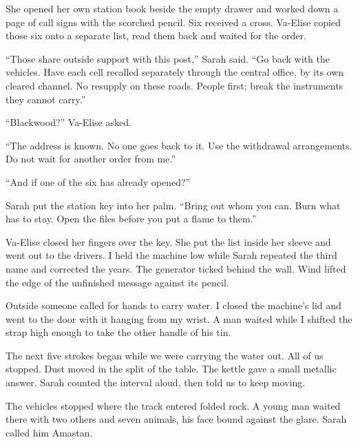 She opened her own station book beside the empty drawer and worked down a page of call signs with the scorched pencil. Six received a cross. Va-Elise copied those six onto a separate list, read them back and waited for the order.\par

``Those share outside support with this post,'' Sarah said. ``Go back with the vehicles. Have each cell recalled separately through the central office, by its own cleared channel. No resupply on these roads. People first; break the instruments they cannot carry.''\par

``Blackwood?'' Va-Elise asked.\par

``The address is known. No one goes back to it. Use the withdrawal arrangements. Do not wait for another order from me.''\par

``And if one of the six has already opened?''\par

Sarah put the station key into her palm. ``Bring out whom you can. Burn what has to stay. Open the files before you put a flame to them.''\par

Va-Elise closed her fingers over the key. She put the list inside her sleeve and went out to the drivers. I held the machine low while Sarah repeated the third name and corrected the years. The generator ticked behind the wall. Wind lifted the edge of the unfinished message against its pencil.\par

Outside someone called for hands to carry water. I closed the machine's lid and went to the door with it hanging from my wrist. A man waited while I shifted the strap high enough to take the other handle of his tin.\par

The next five strokes began while we were carrying the water out. All of us stopped. Dust moved in the split of the table. The kettle gave a small metallic answer. Sarah counted the interval aloud, then told us to keep moving.\par

\ornament

The vehicles stopped where the track entered folded rock. A young man waited there with two others and seven animals, his face bound against the glare. Sarah called him Amastan.\par

